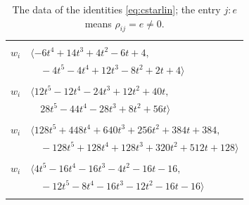 \documentclass[11pt]{article}
\begin{document}
\endgroup

\begingroup\scriptsize
\setlength{\LTcapwidth}{\textwidth}
\begin{longtable}{@{}ll@{}}
\caption{The data of the identities \eqref{eq:cstarlin}; the entry $j{:}e$ means $\rho_{ij}=e\neq0$.}\label{tab:cstar}\\
\hline\endfirsthead\hline\endhead\hline\endfoot
\multicolumn{2}{@{}p{0.97\textwidth}@{}}{$i=0$, $D_i=2$, $\rho_{ij}$: $12{:}1, \allowbreak 15{:}2, \allowbreak 16{:}2, \allowbreak 19{:}1, \allowbreak 26{:}1, \allowbreak 28{:}1, \allowbreak 35{:}1, \allowbreak 39{:}2$}\\
$w_i$ & $\langle -6t^{4}+14t^{3}+4t^{2}-6t+4,$\\
 & $\quad -4t^{5}-4t^{4}+12t^{3}-8t^{2}+2t+4\rangle$\\
\addlinespace[2pt]
\multicolumn{2}{@{}p{0.97\textwidth}@{}}{$i=1$, $D_i=4$, $\rho_{ij}$: $2{:}2, \allowbreak 6{:}2, \allowbreak 13{:}1, \allowbreak 17{:}1, \allowbreak 22{:}2, \allowbreak 24{:}2, \allowbreak 27{:}1, \allowbreak 28{:}2, \allowbreak 33{:}2, \allowbreak 39{:}2, \allowbreak 60{:}2$}\\
$w_i$ & $\langle 12t^{5}-12t^{4}-24t^{3}+12t^{2}+40t,$\\
 & $\quad 28t^{5}-44t^{4}-28t^{3}+8t^{2}+56t\rangle$\\
\addlinespace[2pt]
\multicolumn{2}{@{}p{0.97\textwidth}@{}}{$i=2$, $D_i=64$, $\rho_{ij}$: $1{:}1, \allowbreak 11{:}2, \allowbreak 18{:}1, \allowbreak 21{:}1, \allowbreak 22{:}2, \allowbreak 23{:}2, \allowbreak 32{:}1, \allowbreak 34{:}1, \allowbreak 40{:}1, \allowbreak 51{:}1$}\\
$w_i$ & $\langle 128t^{5}+448t^{4}+640t^{3}+256t^{2}+384t+384,$\\
 & $\quad -128t^{5}+128t^{4}+128t^{3}+320t^{2}+512t+128\rangle$\\
\addlinespace[2pt]
\multicolumn{2}{@{}p{0.97\textwidth}@{}}{$i=3$, $D_i=4$, $\rho_{ij}$: $5{:}1, \allowbreak 9{:}1, \allowbreak 11{:}2, \allowbreak 13{:}1, \allowbreak 17{:}2, \allowbreak 26{:}1, \allowbreak 33{:}1, \allowbreak 37{:}1, \allowbreak 44{:}2, \allowbreak 46{:}1, \allowbreak 58{:}2$}\\
$w_i$ & $\langle 4t^{5}-16t^{4}-16t^{3}-4t^{2}-16t-16,$\\
 & $\quad -12t^{5}-8t^{4}-16t^{3}-12t^{2}-16t-16\rangle$\\
\addlinespace[2pt]
\multicolumn{2}{@{}p{0.97\textwidth}@{}}{$i=4$, $D_i=4$, $\rho_{ij}$: $6{:}1, \allowbreak 9{:}2, \allowbreak 19{:}2, \allowbreak 25{:}2, \allowbreak 31{:}1, \allowbreak 35{:}1, \allowbreak 38{:}1, \allowbreak 39{:}2, \allowbreak 52{:}2$}\\

\end{longtable}
\end{document}
